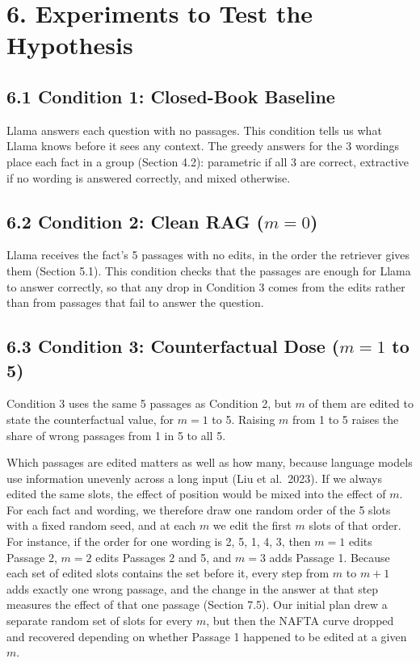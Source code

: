 \documentclass[
  12pt,
  letterpaper,
]{article}
\begin{document}
\section{6. Experiments to Test the
Hypothesis}\label{experiments-to-test-the-hypothesis}

\subsection{6.1 Condition 1: Closed-Book
Baseline}\label{condition-1-closed-book-baseline}

Llama answers each question with no passages. This
condition tells us what Llama knows before it sees
any context. The greedy answers for the 3 wordings
place each fact in a group (Section 4.2):
parametric if all 3 are correct, extractive if no
wording is answered correctly, and mixed
otherwise.

\subsection{\texorpdfstring{6.2 Condition 2: Clean
RAG
(\(m = 0\))}{6.2 Condition 2: Clean RAG (m = 0)}}\label{condition-2-clean-rag-m-0}

Llama receives the fact's 5 passages with no
edits, in the order the retriever gives them
(Section 5.1). This condition checks that the
passages are enough for Llama to answer correctly,
so that any drop in Condition 3 comes from the
edits rather than from passages that fail to
answer the question.

\subsection{\texorpdfstring{6.3 Condition 3:
Counterfactual Dose (\(m = 1\) to
5)}{6.3 Condition 3: Counterfactual Dose (m = 1 to 5)}}\label{condition-3-counterfactual-dose-m-1-to-5}

Condition 3 uses the same 5 passages as Condition
2, but \(m\) of them are edited to state the
counterfactual value, for \(m = 1\) to 5. Raising
\(m\) from 1 to 5 raises the share of wrong
passages from 1 in 5 to all 5.

Which passages are edited matters as well as how
many, because language models use information
unevenly across a long input (Liu et al.~2023). If
we always edited the same slots, the effect of
position would be mixed into the effect of \(m\).
For each fact and wording, we therefore draw one
random order of the 5 slots with a fixed random
seed, and at each \(m\) we edit the first \(m\)
slots of that order. For instance, if the order
for one wording is 2, 5, 1, 4, 3, then \(m = 1\)
edits Passage 2, \(m = 2\) edits Passages 2 and 5,
and \(m = 3\) adds Passage 1. Because each set of
edited slots contains the set before it, every
step from \(m\) to \(m + 1\) adds exactly one
wrong passage, and the change in the answer at
that step measures the effect of that one passage
(Section 7.5). Our initial plan drew a separate
random set of slots for every \(m\), but then the
NAFTA curve dropped and recovered depending on
whether Passage 1 happened to be edited at a given
\(m\).
\end{document}
